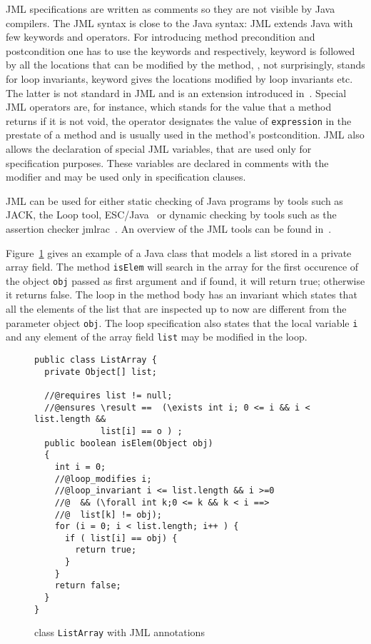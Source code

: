 JML specifications are written as comments so they are not visible by Java compilers. The JML syntax is close to the 
 Java syntax: JML extends Java with few keywords and operators.
 For introducing method precondition and postcondition one has to use the keywords  and  
  respectively,   keyword is followed by all the locations that can be modified by the method, 
  , not surprisingly, stands for loop invariants,  keyword gives the locations modified by loop invariants etc. 
  The latter is not standard in JML and is an extension introduced in~\cite{BRL-JACK}. Special JML operators are, for instance,  which stands for the value that a method returns if it is not void, the  operator 
  designates the value of \texttt{expression} in the prestate of a method and is usually used in the method's postcondition. 
  JML also allows the declaration of special JML variables, that are used only for specification purposes. 
These variables are declared in comments with the  modifier and may be used only in specification clauses. 

JML can be used for either static checking of Java programs by tools such as JACK, the Loop tool, 
ESC/Java~\cite{escjava} or dynamic checking by tools such as the assertion checker jmlrac~\cite{jmlrac}. An overview of the JML tools can 
be found in~\cite{BurdyCCEKLLP03}.
     
Figure~\ref{replaceSrc} gives an example of a Java class that models a list stored in a private array field. 
The method \texttt{isElem} will search in the array for the first occurence of the object \texttt{obj} passed as first argument and if found, it will return true; 
otherwise it returns false. The loop in the method body has an invariant which states that all the elements of the list that are inspected up to now are different from the parameter object \texttt{obj}. The loop specification also states
that the local variable \texttt{i} and any element of the array field \texttt{list} may be modified in the loop.

\begin{figure}[!h]
\begin{verbatim}
public class ListArray {
  private Object[] list;

  //@requires list != null;
  //@ensures \result ==  (\exists int i; 0 <= i && i < list.length &&  
             list[i] == o ) ; 
  public boolean isElem(Object obj)
  {
    int i = 0;
    //@loop_modifies i;
    //@loop_invariant i <= list.length && i >=0 
    //@  && (\forall int k;0 <= k && k < i ==> 
    //@  list[k] != obj); 
    for (i = 0; i < list.length; i++ ) {
      if ( list[i] == obj) {
        return true;	
      }
    }
    return false;
  }
}
\end{verbatim}
\caption{class \texttt{ListArray} with JML annotations} 
\label{replaceSrc}
\end{figure}

